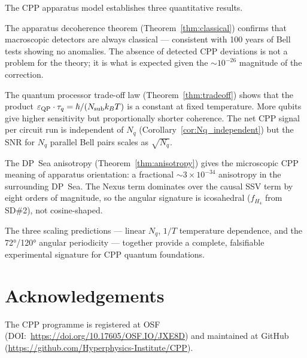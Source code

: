 \documentclass[11pt,letterpaper]{article}
\newcommand{\eps}{\varepsilon}
\begin{document}
The CPP apparatus model establishes three quantitative results.

The apparatus decoherence theorem (Theorem~\ref{thm:classical})
confirms that macroscopic detectors are always classical ---
consistent with 100 years of Bell tests showing no anomalies.  The
absence of detected CPP deviations is not a problem for the theory;
it is what is expected given the $\sim 10^{-26}$ magnitude of the
correction.

The quantum processor trade-off law (Theorem~\ref{thm:tradeoff})
shows that the product $\eps_{\rm QP} \cdot \tau_q = \hbar /
(N_{\rm sub} k_B T)$ is a constant at fixed temperature.  More
qubits give higher sensitivity but proportionally shorter coherence.
The net CPP signal per circuit run is independent of $N_q$
(Corollary~\ref{cor:Nq_independent}) but the SNR for $N_q$ parallel
Bell pairs scales as $\sqrt{N_q}$.

The DP~Sea anisotropy (Theorem~\ref{thm:anisotropy}) gives the
microscopic CPP meaning of apparatus orientation: a fractional
$\sim 3 \times 10^{-34}$ anisotropy in the surrounding DP~Sea.
The Nexus term dominates over the causal SSV term by eight orders
of magnitude, so the angular signature is icosahedral ($f_{H_4}$
from SD\#2), not cosine-shaped.

The three scaling predictions --- linear $N_q$, $1/T$ temperature
dependence, and the 72°/120° angular periodicity --- together provide
a complete, falsifiable experimental signature for CPP quantum
foundations.





\section*{Acknowledgements}
The CPP programme is registered at OSF (DOI:~\url{https://doi.org/10.17605/OSF.IO/JXE8D}) and maintained at GitHub (\url{https://github.com/Hyperphysics-Institute/CPP}).
\end{document}
